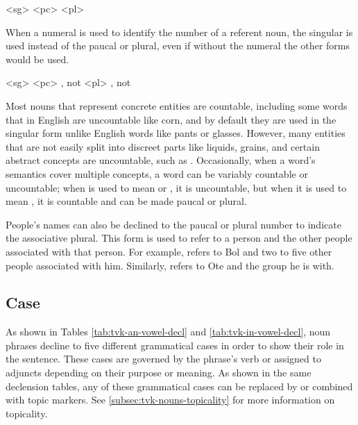 	\a<sg>    
	\a<pc>    
	\a<pl>    
\xe

When a numeral is used to identify the number of a referent noun, the singular is used instead of the paucal or plural, even if without the numeral the other forms would be used\autocite{wals-34}.

	\a<sg>    
	\a<pc>    , not 
	\a<pl>    , not 
\xe

Most nouns that represent concrete entities are countable, including some words that in English are uncountable like corn, and by default they are used in the singular form unlike English words like pants or glasses. However, many entities that are not easily split into discreet parts like liquids, grains, and certain abstract concepts are uncountable, such as   . Occasionally, when a word's semantics cover multiple concepts, a word can be variably countable or uncountable; when   is used to mean  or , it is uncountable, but when it is used to mean , it is countable and can be made paucal or plural.

People's names can also be declined to the paucal or plural number to indicate the associative plural\autocite{wals-36}. This form is used to refer to a person and the other people associated with that person. For example,    refers to Bol and two to five other people associated with him. Similarly,    refers to Ote and the group he is with.

\subsection{Case}
\label{subsec:tvk-nouns-case}

As shown in Tables \ref{tab:tvk-an-vowel-decl} and \ref{tab:tvk-in-vowel-decl}, \langtvk{} noun phrases decline to five different grammatical cases\autocite{wals-49} in order to show their role in the sentence. These cases are governed by the phrase's verb or assigned to adjuncts depending on their purpose or meaning. As shown in the same declension tables, any of these grammatical cases can be replaced by or combined with topic markers. See \autoref{subsec:tvk-nouns-topicality} for more information on topicality.

